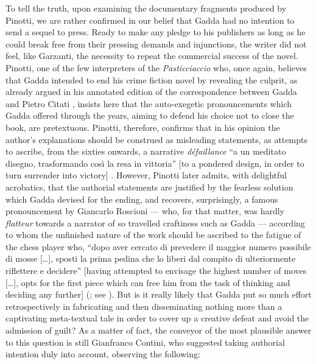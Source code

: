 \begin{review}
To tell the truth, upon examining the documentary fragments produced by
Pinotti, we are rather confirmed in our belief that Gadda had no
intention to send a sequel to press. Ready to make any pledge to
his publishers as long as he could break free from their pressing
demands and injunctions, the writer did not feel, like Garzanti, the
necessity to repeat the commercial success of the novel. Pinotti, one of
the few interpreters of the \emph{Pasticciaccio} who, once again,
believes that Gadda intended to end his crime fiction novel by revealing
the culprit, as already argued in his annotated edition of the
correspondence between Gadda and Pietro Citati \citep{gadda_gomitolo_2013}, insists
here that the auto-exegetic pronouncements which Gadda offered through
the years, aiming to defend his choice not to close the book, are
pretextuous. Pinotti, therefore, confirms that in his opinion the
author's explanations should be construed as misleading statements, as
attempts to ascribe, from the sixties onwards, a narrative
\emph{défaillance} ``a un meditato disegno, trasformando così la resa in
vittoria'' {[}to a pondered design, in order to turn
surrender into victory{]} \citep[347]{pinotti_nota_2018}. However, Pinotti later admits, with delightful
acrobatics, that the authorial statements are justified by the fearless
solution which Gadda devised for the ending, and recovers, surprisingly,
a famous pronouncement by Giancarlo Roscioni --- who, for that matter,
was hardly \emph{flatteur} towards a narrator of so travelled craftiness
such as Gadda --- according to whom the unfinished nature of the work
should be ascribed to the fatigue of the chess player who, ``dopo aver
cercato di prevedere il maggior numero possibile di mosse {[}\dots{}{]},
sposti la prima pedina che lo liberi dal compito di ulteriormente
riflettere e decidere''
{[}having attempted to envisage the highest number of moves {[}\dots{}{]},
opts for the first piece which can free him from the task of thinking
and deciding any further{]} (\citealt[91--92]{roscioni_disarmonia_1975}; see \citealt[347]{pinotti_nota_2018}). But is it really likely that Gadda put
so much effort retrospectively in fabricating and then disseminating
nothing more than a captivating meta-textual tale in order to cover up a
creative defeat and avoid the admission of guilt? As a matter of fact,
the conveyor of the most plausible answer to this question is still
Gianfranco Contini, who suggested taking authorial intention duly into
account, observing the following:

\begin{quote}


\end{quote}
\end{review}
